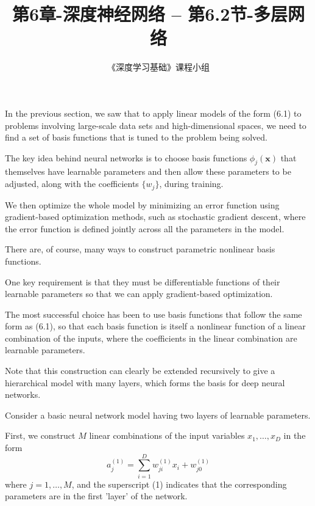 \documentclass{article}
\title{第6章-深度神经网络 -- 第6.2节-多层网络}
\author{《深度学习基础》课程小组}
\begin{document}
\maketitle
\tableofcontents

\setlength{\parindent}{0pt} %
\setlength{\parskip}{1.5em} %


In the previous section, we saw that to apply linear models of the form (6.1) to problems involving large-scale data sets and high-dimensional spaces, we need to find a set of basis functions that is tuned to the problem being solved. 

The key idea behind neural networks is to choose basis functions $\phi_j(\mathbf{x})$ that themselves have learnable parameters and then allow these parameters to be adjusted, along with the coefficients $\{w_j\}$, during training. 

We then optimize the whole model by minimizing an error function using gradient-based optimization methods, such as stochastic gradient descent, where the error function is defined jointly across all the parameters in the model.

There are, of course, many ways to construct parametric nonlinear basis functions. 

One key requirement is that they must be differentiable functions of their learnable parameters so that we can apply gradient-based optimization. 

The most successful choice has been to use basis functions that follow the same form as (6.1), so that each basis function is itself a nonlinear function of a linear combination of the inputs, where the coefficients in the linear combination are learnable parameters. 

Note that this construction can clearly be extended recursively to give a hierarchical model with many layers, which forms the basis for deep neural networks.

Consider a basic neural network model having two layers of learnable parameters. 

First, we construct $M$ linear combinations of the input variables $x_1, \ldots, x_D$ in the form
\begin{equation}
a_j^{(1)} = \sum_{i=1}^{D} w_{ji}^{(1)} x_i + w_{j0}^{(1)} \tag{6.7}
\end{equation}
where $j = 1, \ldots, M$, and the superscript (1) indicates that the corresponding parameters are in the first 'layer' of the network. 
\end{document}

